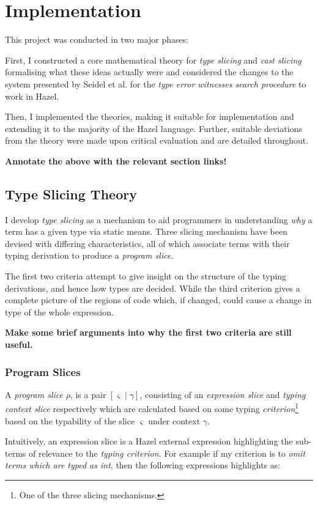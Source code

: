 \chapter{Implementation}\label{chap:Implementation}
This project was conducted in two major phases:

First, I constructed a core mathematical theory for \textit{type slicing} and \textit{cast slicing} formalising what these ideas actually were and considered the changes to the system presented by Seidel et al. for the \textit{type error witnesses search procedure} to work in Hazel.  

Then, I implemented the theories, making it suitable for implementation and extending it to the majority of the Hazel language. Further, suitable deviations from the theory were made upon critical evaluation and are detailed throughout.

\textbf{Annotate the above with the relevant section links!}
\section{Type Slicing Theory}\label{sec:TypeSlicingTheory}
I develop \textit{type slicing} as a mechanism to aid programmers in understanding \textit{why} a term has a given type via static means. Three slicing mechanism have been devised with differing characteristics, all of which associate terms with their typing derivation to produce a \textit{program slice}. 

The first two criteria attempt to give insight on the structure of the typing derivations, and hence how types are decided. While the third criterion gives a complete picture of the regions of code which, if changed, could cause a change in type of the whole expression.

\textbf{Make some brief arguments into why the first two criteria are still useful.}

\subsection{Program Slices}
A \textit{program slice} $\rho$, is a pair $[\varsigma \mid \gamma]$, consisting of an \textit{expression slice} and \textit{typing context slice} respectively which are calculated based on some typing \textit{criterion}\footnote{One of the three slicing mechanisms.} based on the typability of the slice $\varsigma$ under context $\gamma$. 

Intuitively, an expression slice is a Hazel external expression highlighting the sub-terms of relevance to the \textit{typing criterion}. For example if my criterion is to \textit{omit terms which are typed as int}, then the following expressions highlights as:

